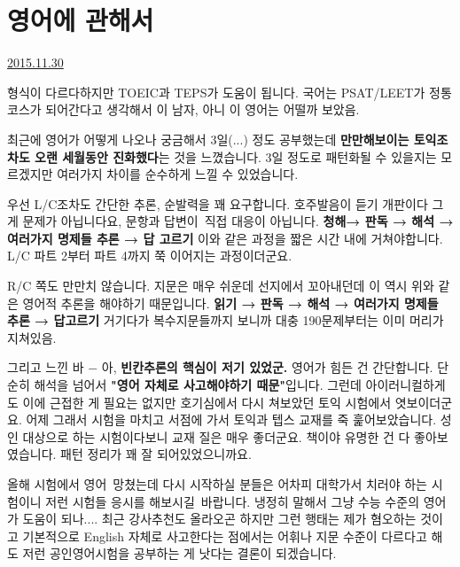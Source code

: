 \section{영어에 관해서}
\href{https://www.kockoc.com/Apoc/518404}{2015.11.30}

\vspace{5mm}

형식이 다르다하지만 TOEIC과 TEPS가 도움이 됩니다.
국어는 PSAT/LEET가 정통코스가 되어간다고 생각해서 이 남자, 아니 이 영어는 어떨까 보았음.
\vspace{5mm}

최근에 영어가 어떻게 나오나 궁금해서 3일(...) 정도 공부했는데
\textbf{만만해보이는 토익조차도 오랜 세월동안 진화했다}는 것을 느꼈습니다.
3일 정도로 패턴화될 수 있을지는 모르겠지만
여러가지 차이를 순수하게 느낄 수 있었습니다.
\vspace{5mm}

우선 L/C조차도 간단한 추론, 순발력을 꽤 요구합니다. 호주발음이 듣기 개판이다 그게 문제가 아닙니다요,
문항과 답변이 직접 대응이 아닙니다.
\textbf{청해→ 판독 → 해석 → 여러가지 명제들 추론 → 답 고르기}
이와 같은 과정을 짧은 시간 내에 거쳐야합니다.
L/C 파트 2부터 파트 4까지 쭉 이어지는 과정이더군요.
\vspace{5mm}

R/C 쪽도 만만치 않습니다. 지문은 매우 쉬운데 선지에서 꼬아내던데
이 역시 위와 같은 영어적 추론을 해야하기 때문입니다.
\textbf{읽기 → 판독 → 해석 → 여러가지 명제들 추론 → 답고르기}
거기다가 복수지문들까지 보니까 대충 190문제부터는 이미 머리가 지쳐있음.
\vspace{5mm}

그리고 느낀 바 $-$ 아, \textbf{빈칸추론의 핵심이 저기 있었군.}
영어가 힘든 건 간단합니다. 단순히 해석을 넘어서 \textbf{"영어 자체로 사고해야하기 때문"}입니다.
그런데 아이러니컬하게도 이에 근접한 게 필요는 없지만 호기심에서 다시 쳐보았던 토익 시험에서 엿보이더군요.
어제 그래서 시험을 마치고 서점에 가서 토익과 텝스 교재를 죽 훑어보았습니다.
성인 대상으로 하는 시험이다보니 교재 질은 매우 좋더군요.
책이야 유명한 건 다 좋아보였습니다. 패턴 정리가 꽤 잘 되어있었으니까요.
\vspace{5mm}

올해 시험에서 영어 망쳤는데 다시 시작하실 분들은
어차피 대학가서 치러야 하는 시험이니 저런 시험들 응시를 해보시길 바랍니다.
냉정히 말해서 그냥 수능 수준의 영어가 도움이 되나.... 최근 강사추천도 올라오곤 하지만 그런 행태는 제가 혐오하는 것이고
기본적으로 English 자체로 사고한다는 점에서는 어휘나 지문 수준이 다르다고 해도 저런 공인영어시험을 공부하는 게 낫다는 결론이 되겠습니다.
\vspace{5mm}

